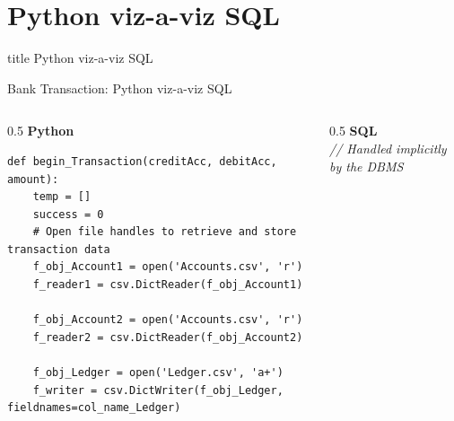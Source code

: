 \documentclass[aspectratio=169, xcolor=dvipsnames]{beamer}
\begin{document}
\section{Python viz-a-viz SQL}

\begin{frame}
  \vfill
  \centering
  \begin{beamercolorbox}[sep=8pt,center,shadow=true,rounded=true]{title}
    Python viz-a-viz SQL\par%
  \end{beamercolorbox}
  \vfill
\end{frame}

\begin{frame}[fragile]{Bank Transaction: Python viz-a-viz SQL}
    \begin{columns}[T]
        \begin{column}{0.5\textwidth}
            \textbf{Python}
            \begin{verbatim}
def begin_Transaction(creditAcc, debitAcc, amount):
    temp = [] 
    success = 0
    # Open file handles to retrieve and store transaction data
    f_obj_Account1 = open('Accounts.csv', 'r')
    f_reader1 = csv.DictReader(f_obj_Account1)
    
    f_obj_Account2 = open('Accounts.csv', 'r')
    f_reader2 = csv.DictReader(f_obj_Account2)
    
    f_obj_Ledger = open('Ledger.csv', 'a+')
    f_writer = csv.DictWriter(f_obj_Ledger, fieldnames=col_name_Ledger)
            \end{verbatim}
        \end{column}
        \begin{column}{0.5\textwidth}
            \textbf{SQL} \\
            \vspace{1em}
            \textit{// Handled implicitly by the DBMS}
        \end{column}
    \end{columns}
\end{frame}
\end{document}
